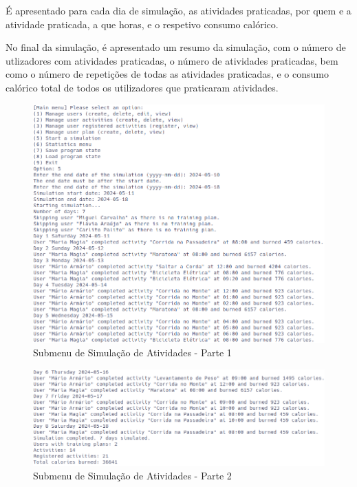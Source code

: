 \documentclass[a4paper,12pt]{scrreprt}
\begin{document}
    É apresentado para cada dia de simulação, as atividades praticadas,
    por quem e a atividade praticada, a que horas, e o respetivo consumo calórico.

    No final da simulação, é apresentado um resumo da simulação,
    com o número de utlizadores com atividades praticadas,
    o número de atividades praticadas,
    bem como o número de repetições de todas as atividades praticadas,
    e o consumo calórico total de todos os utilizadores que praticaram atividades.

    \begin{figure}[!ht]
        \centering
        \includegraphics[width=\textwidth]{images/Simulation1.png}
        \caption{Submenu de Simulação de Atividades - Parte 1}
        \label{fig:submenu-simulate-1}
    \end{figure}

    \begin{figure}[!ht]
        \centering
        \includegraphics[width=\textwidth]{images/Simulation2.png}
        \caption{Submenu de Simulação de Atividades - Parte 2}
        \label{fig:submenu-simulate-2}
    \end{figure}
\end{document}
